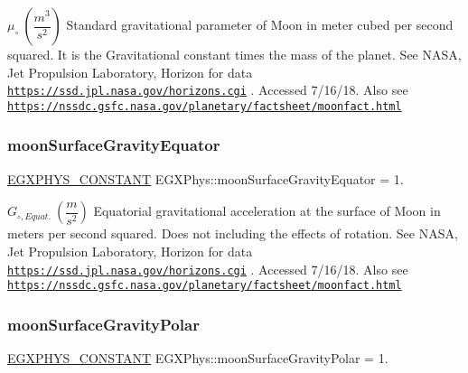 $ \mu_{\circ} \ (\dfrac{m^3}{s^2})$ Standard gravitational parameter of Moon in meter cubed per second squared. It is the Gravitational constant times the mass of the planet. See N\+A\+SA, Jet Propulsion Laboratory, Horizon for data \href{https://ssd.jpl.nasa.gov/horizons.cgi}{\tt https\+://ssd.\+jpl.\+nasa.\+gov/horizons.\+cgi} . Accessed 7/16/18. Also see \href{https://nssdc.gsfc.nasa.gov/planetary/factsheet/moonfact.html}{\tt https\+://nssdc.\+gsfc.\+nasa.\+gov/planetary/factsheet/moonfact.\+html} \mbox{\label{group___e_g_x_phys-_constants-_astrophysics-_solar_system-_moon-_bulk_ga36c6c66edb5581476f1756448601406a}} 
\subsubsection{\texorpdfstring{moon\+Surface\+Gravity\+Equator}{moonSurfaceGravityEquator}}
{\footnotesize\ttfamily \mbox{\hyperlink{group___e_g_x_phys-_constants-_macros_ga76980d288494ce1714c9ac68a95ba702}{E\+G\+X\+P\+H\+Y\+S\+\_\+\+C\+O\+N\+S\+T\+A\+NT}} E\+G\+X\+Phys\+::moon\+Surface\+Gravity\+Equator = 1.}

$ G_{\circ,Equat.} \ (\dfrac{m}{s^2})$ Equatorial gravitational acceleration at the surface of Moon in meters per second squared. Does not including the effects of rotation. See N\+A\+SA, Jet Propulsion Laboratory, Horizon for data \href{https://ssd.jpl.nasa.gov/horizons.cgi}{\tt https\+://ssd.\+jpl.\+nasa.\+gov/horizons.\+cgi} . Accessed 7/16/18. Also see \href{https://nssdc.gsfc.nasa.gov/planetary/factsheet/moonfact.html}{\tt https\+://nssdc.\+gsfc.\+nasa.\+gov/planetary/factsheet/moonfact.\+html} \mbox{\label{group___e_g_x_phys-_constants-_astrophysics-_solar_system-_moon-_bulk_gaf19f7224dee5a3e7b5f23df00239802f}} 
\subsubsection{\texorpdfstring{moon\+Surface\+Gravity\+Polar}{moonSurfaceGravityPolar}}
{\footnotesize\ttfamily \mbox{\hyperlink{group___e_g_x_phys-_constants-_macros_ga76980d288494ce1714c9ac68a95ba702}{E\+G\+X\+P\+H\+Y\+S\+\_\+\+C\+O\+N\+S\+T\+A\+NT}} E\+G\+X\+Phys\+::moon\+Surface\+Gravity\+Polar = 1.}


